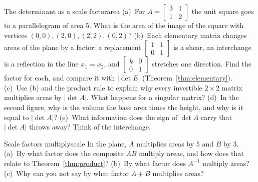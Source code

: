 \documentclass[11pt]{article}
\begin{document}
\begin{think}{The determinant as a scale factor}{area}
(a)~For $A=\begin{bmatrix}3&1\\1&2\end{bmatrix}$ the unit square goes to a parallelogram of area $5$. What is the area of the image of the square with vertices $(0,0),(2,0),(2,2),(0,2)$? (b)~Each elementary matrix changes areas of the plane by a factor: a replacement $\begin{bmatrix}1&1\\0&1\end{bmatrix}$ is a shear, an interchange is a reflection in the line $x_1=x_2$, and $\begin{bmatrix}k&0\\0&1\end{bmatrix}$ stretches one direction. Find the factor for each, and compare it with $|\det E|$ (Theorem~\ref{thm:elementary}). (c)~Use (b) and the product rule to explain why every invertible $2\times2$ matrix multiplies areas by $|\det A|$. What happens for a singular matrix? (d)~In the second figure, why is the volume the base area times the height, and why is it equal to $|\det A|$? (e)~What information does the sign of $\det A$ carry that $|\det A|$ throws away? Think of the interchange.
\end{think}

\begin{think}{Scale factors multiply}{scale}
In the plane, $A$ multiplies areas by $5$ and $B$ by $3$. (a)~By what factor does the composite $AB$ multiply areas, and how does that relate to Theorem~\ref{thm:product}? (b)~By what factor does $A^{-1}$ multiply areas? (c)~Why can you not say by what factor $A+B$ multiplies areas?
\end{think}
\end{document}

